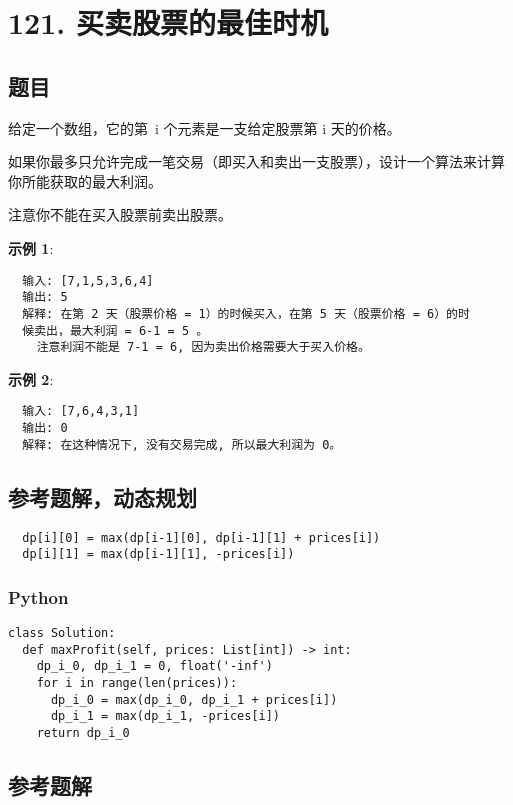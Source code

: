 \newpage
\section{121. 买卖股票的最佳时机}
\label{leetcode:121}

\subsection{题目}

给定一个数组，它的第 i 个元素是一支给定股票第 i 天的价格。

如果你最多只允许完成一笔交易（即买入和卖出一支股票），设计一个算法来计算你所能获取的最大利润。

注意你不能在买入股票前卖出股票。

\textbf{示例 1}:

\begin{verbatim}
  输入: [7,1,5,3,6,4]
  输出: 5
  解释: 在第 2 天（股票价格 = 1）的时候买入，在第 5 天（股票价格 = 6）的时
  候卖出，最大利润 = 6-1 = 5 。
    注意利润不能是 7-1 = 6, 因为卖出价格需要大于买入价格。
\end{verbatim}

\textbf{示例 2}:

\begin{verbatim}
  输入: [7,6,4,3,1]
  输出: 0
  解释: 在这种情况下, 没有交易完成, 所以最大利润为 0。
\end{verbatim}

\subsection{参考题解，动态规划}

\begin{verbatim}
  dp[i][0] = max(dp[i-1][0], dp[i-1][1] + prices[i])
  dp[i][1] = max(dp[i-1][1], -prices[i])
\end{verbatim}

\subsubsection{Python}

\begin{verbatim}
class Solution:
  def maxProfit(self, prices: List[int]) -> int:
    dp_i_0, dp_i_1 = 0, float('-inf')
    for i in range(len(prices)):
      dp_i_0 = max(dp_i_0, dp_i_1 + prices[i])
      dp_i_1 = max(dp_i_1, -prices[i])
    return dp_i_0
\end{verbatim}

\subsection{参考题解}

